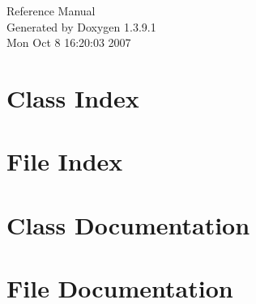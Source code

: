 \documentclass[a4paper]{book}
\begin{document}
\begin{titlepage}
\vspace*{7cm}
\begin{center}
{\Large Reference Manual}\\
\vspace*{1cm}
{\large Generated by Doxygen 1.3.9.1}\\
\vspace*{0.5cm}
{\small Mon Oct 8 16:20:03 2007}\\
\end{center}
\end{titlepage}
\clearemptydoublepage
{}
\tableofcontents
\clearemptydoublepage
{}
\chapter{Class Index}

\chapter{File Index}

\chapter{Class Documentation}



\chapter{File Documentation}



\printindex
\end{document}
